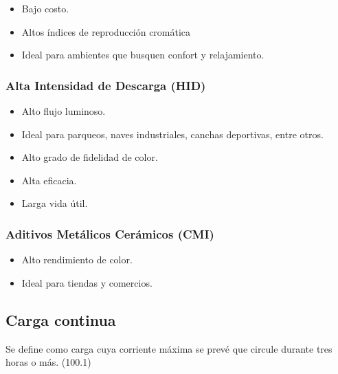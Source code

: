 \begin{itemize}
	
	\item Bajo costo.
	
	\item Altos índices de reproducción cromática
	
	\item Ideal para ambientes que busquen confort y relajamiento.
	
\end{itemize}


\subsubsection{Alta Intensidad de Descarga (HID)}


\begin{itemize}
	
	\item  Alto flujo luminoso.
	
	\item Ideal para parqueos, naves industriales, canchas deportivas, entre otros.
	
	\item Alto grado de fidelidad de color.
	
	\item Alta eficacia.
	
	\item Larga vida útil.
	
\end{itemize}

\subsubsection{Aditivos Metálicos Cerámicos (CMI)}

\begin{itemize}
	
	\item Alto rendimiento de color.
	
	\item Ideal para tiendas y comercios.
	
\end{itemize}




\subsection{Carga continua}

Se define como carga cuya corriente máxima se prevé que circule durante tres horas o más. (100.1) \cite{NFPA70}


